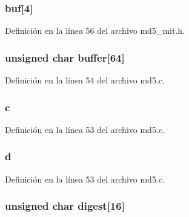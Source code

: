 \subsubsection[{buf}]{ buf\mbox{[}4\mbox{]}}\label{struct_m_d5___c_t_x_a7dc178b045dfbd504687dc9b0834d1d6}


Definición en la línea 56 del archivo md5\+\_\+mit.\+h.

\hypertarget{struct_m_d5___c_t_x_a59e96eea04541ecd67c3faca41b13feb}{}
\subsubsection[{buffer}]{\setlength{\rightskip}{0pt plus 5cm}unsigned char buffer\mbox{[}64\mbox{]}}\label{struct_m_d5___c_t_x_a59e96eea04541ecd67c3faca41b13feb}


Definición en la línea 54 del archivo md5.\+c.

\hypertarget{struct_m_d5___c_t_x_a1f90d3ede1c4253a90685d1260482dfc}{}
\subsubsection[{c}]{ c}\label{struct_m_d5___c_t_x_a1f90d3ede1c4253a90685d1260482dfc}


Definición en la línea 53 del archivo md5.\+c.

\hypertarget{struct_m_d5___c_t_x_a42be18d895cf7be9097073faf66734c1}{}
\subsubsection[{d}]{ d}\label{struct_m_d5___c_t_x_a42be18d895cf7be9097073faf66734c1}


Definición en la línea 53 del archivo md5.\+c.

\hypertarget{struct_m_d5___c_t_x_a9c185c9970b81e602c4374ffe2c117e8}{}
\subsubsection[{digest}]{\setlength{\rightskip}{0pt plus 5cm}unsigned char digest\mbox{[}16\mbox{]}}\label{struct_m_d5___c_t_x_a9c185c9970b81e602c4374ffe2c117e8}


